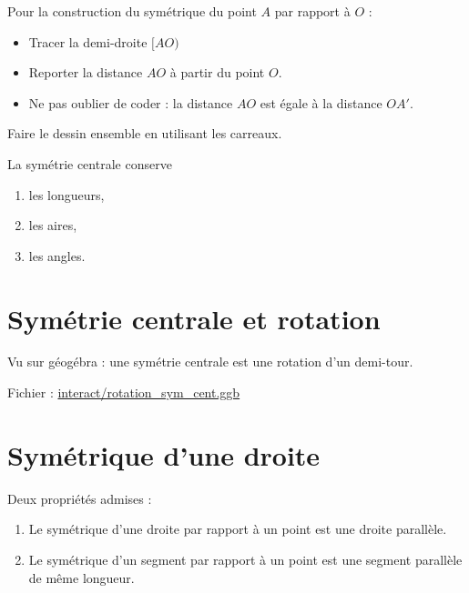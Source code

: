 Pour la construction du symétrique du point \( A\) par rapport à \( O\) :
\begin{itemize}
    \item Tracer la demi-droite \(  [AO) \)
    \item Reporter la distance \( AO\) à partir du point \( O\).
    \item Ne pas oublier de coder : la distance \( AO\) est égale à la distance \( OA'\).
\end{itemize}

\begin{center}
    
\end{center}

Faire le dessin ensemble en utilisant les carreaux.
\begin{center}
   
\end{center}

\begin{propriete}
    La symétrie centrale conserve
    \begin{enumerate}
        \item
            les longueurs,
        \item
            les aires,
        \item
            les angles.
    \end{enumerate}
\end{propriete}

\section{Symétrie centrale et rotation}

Vu sur géogébra : une symétrie centrale est une rotation d'un demi-tour.

Fichier : \url{interact/rotation\_sym\_cent.ggb}

\section{Symétrique d'une droite}



Deux propriétés admises :
\begin{propriete}
    \begin{enumerate}
        \item
            Le symétrique d'une droite par rapport à un point est une droite parallèle.
        \item
            Le symétrique d'un segment par rapport à un point est une segment parallèle de même longueur.
    \end{enumerate}
\end{propriete}

